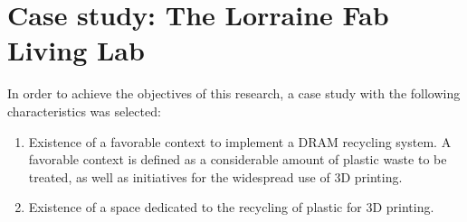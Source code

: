 \documentclass[12pt]{elsarticle} %
\providecommand{\tightlist}{%
  \setlength{\itemsep}{0pt}\setlength{\parskip}{0pt}}
\begin{document}
\hypertarget{lf2l}{%
\section{Case study: The Lorraine Fab Living Lab}\label{lf2l}}

In order to achieve the objectives of this research, a case study with the following characteristics was selected:

\begin{enumerate}
\def\labelenumi{\arabic{enumi}.}
\tightlist
\item
  Existence of a favorable context to implement a DRAM recycling system. A favorable context is defined as a considerable amount of plastic waste to be treated, as well as initiatives for the widespread use of 3D printing.
\item
  Existence of a space dedicated to the recycling of plastic for 3D printing.
\end{enumerate}
\end{document}
